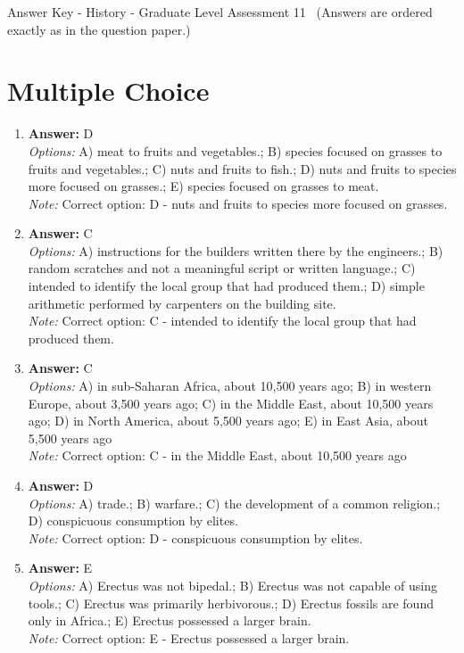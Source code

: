 \documentclass[12pt]{article}
\begin{document}
\begin{center}
Answer Key - History - Graduate Level Assessment 11 \
\small (Answers are ordered exactly as in the question paper.)
\end{center}

\section*{Multiple Choice}
\begin{enumerate}[label=\arabic*.]
\item \textbf{Answer:} D
\\ \textit{Options:} A) meat to fruits and vegetables.; B) species focused on grasses to fruits and vegetables.; C) nuts and fruits to fish.; D) nuts and fruits to species more focused on grasses.; E) species focused on grasses to meat.
\\ \textit{Note:} Correct option: D - nuts and fruits to species more focused on grasses.
\item \textbf{Answer:} C
\\ \textit{Options:} A) instructions for the builders written there by the engineers.; B) random scratches and not a meaningful script or written language.; C) intended to identify the local group that had produced them.; D) simple arithmetic performed by carpenters on the building site.
\\ \textit{Note:} Correct option: C - intended to identify the local group that had produced them.
\item \textbf{Answer:} C
\\ \textit{Options:} A) in sub-Saharan Africa, about 10,500 years ago; B) in western Europe, about 3,500 years ago; C) in the Middle East, about 10,500 years ago; D) in North America, about 5,500 years ago; E) in East Asia, about 5,500 years ago
\\ \textit{Note:} Correct option: C - in the Middle East, about 10,500 years ago
\item \textbf{Answer:} D
\\ \textit{Options:} A) trade.; B) warfare.; C) the development of a common religion.; D) conspicuous consumption by elites.
\\ \textit{Note:} Correct option: D - conspicuous consumption by elites.
\item \textbf{Answer:} E
\\ \textit{Options:} A) Erectus was not bipedal.; B) Erectus was not capable of using tools.; C) Erectus was primarily herbivorous.; D) Erectus fossils are found only in Africa.; E) Erectus possessed a larger brain.
\\ \textit{Note:} Correct option: E - Erectus possessed a larger brain.
\end{enumerate}
\end{document}
